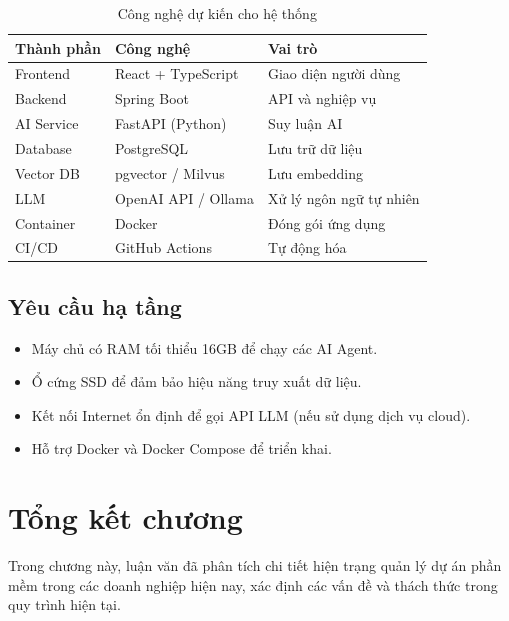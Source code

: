 \documentclass[12pt,a4paper]{report}
\begin{document}
\begin{table}[H]
\centering
\caption{Công nghệ dự kiến cho hệ thống}
\begin{tabular}{|p{4cm}|p{5cm}|p{5cm}|}
\hline
\textbf{Thành phần} & \textbf{Công nghệ} & \textbf{Vai trò} \\
\hline
Frontend & React + TypeScript & Giao diện người dùng \\
\hline
Backend & Spring Boot & API và nghiệp vụ \\
\hline
AI Service & FastAPI (Python) & Suy luận AI \\
\hline
Database & PostgreSQL & Lưu trữ dữ liệu \\
\hline
Vector DB & pgvector / Milvus & Lưu embedding \\
\hline
LLM & OpenAI API / Ollama & Xử lý ngôn ngữ tự nhiên \\
\hline
Container & Docker & Đóng gói ứng dụng \\
\hline
CI/CD & GitHub Actions & Tự động hóa \\
\hline
\end{tabular}
\label{tab:technology_stack}
\end{table}

\subsection{Yêu cầu hạ tầng}

\begin{itemize}
\item Máy chủ có RAM tối thiểu 16GB để chạy các AI Agent.
\item Ổ cứng SSD để đảm bảo hiệu năng truy xuất dữ liệu.
\item Kết nối Internet ổn định để gọi API LLM (nếu sử dụng dịch vụ cloud).
\item Hỗ trợ Docker và Docker Compose để triển khai.
\end{itemize}

\section{Tổng kết chương}


Trong chương này, luận văn đã phân tích chi tiết hiện trạng quản lý dự án phần mềm trong các doanh nghiệp hiện nay, xác định các vấn đề và thách thức trong quy trình hiện tại.
\end{document}

